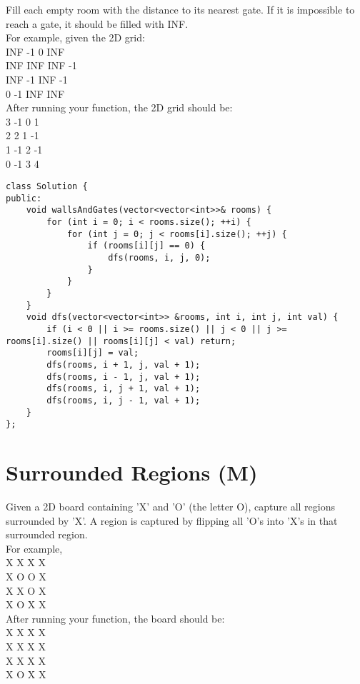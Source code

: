 Fill each empty room with the distance to its nearest gate. If it is impossible to reach a gate, it should be filled with INF.\\

For example, given the 2D grid:\\
INF  -1  0  INF\\
INF INF INF  -1\\
INF  -1 INF  -1\\
  0  -1 INF INF\\

After running your function, the 2D grid should be:\\
  3  -1   0   1\\
  2   2   1  -1\\
  1  -1   2  -1\\
  0  -1   3   4\\

\begin{lstlisting}
class Solution {
public:
    void wallsAndGates(vector<vector<int>>& rooms) {
        for (int i = 0; i < rooms.size(); ++i) {
            for (int j = 0; j < rooms[i].size(); ++j) {
                if (rooms[i][j] == 0) {
                    dfs(rooms, i, j, 0);
                }
            }
        }
    }
    void dfs(vector<vector<int>> &rooms, int i, int j, int val) {
        if (i < 0 || i >= rooms.size() || j < 0 || j >= rooms[i].size() || rooms[i][j] < val) return;
        rooms[i][j] = val;
        dfs(rooms, i + 1, j, val + 1);
        dfs(rooms, i - 1, j, val + 1);
        dfs(rooms, i, j + 1, val + 1);
        dfs(rooms, i, j - 1, val + 1);
    }
};
\end{lstlisting}


\section{Surrounded Regions (M)}
Given a 2D board containing 'X' and 'O' (the letter O), capture all regions surrounded by 'X'. A region is captured by flipping all 'O's into 'X's in that surrounded region.\\

For example,\\
X X X X\\
X O O X\\
X X O X\\
X O X X\\

After running your function, the board should be:\\
X X X X\\
X X X X\\
X X X X\\
X O X X\\

